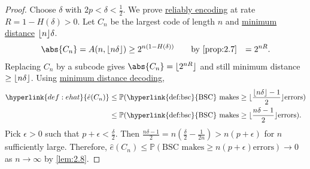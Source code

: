 \documentclass{article}
\DeclarePairedDelimiter{\floor}{\lfloor}{\rfloor}
\newcommand{\Prob}{\mathbb{P}}
\newcommand{\1}[1]{\mathbbm{1}_{#1}}
\begin{document}
\begin{proof}
    Choose $\delta$ with $2 p < \delta < \frac{1}{2}$. We prove \hyperlink{def:relTrans}{reliably encoding} at rate $R = 1 - H(\delta) > 0$.
    Let $C_n$ be the largest code of length $n$ and \hyperlink{def:minimumDistanceCode}{minimum distance} $\floor n \delta$.
    \begin{align*}
        \abs{C_n} = A(n, \floor{n \delta}) &\geq 2^{n (1 - H(\delta))} \qquad \text{by \cref{prop:2.7}}
                                           &= 2^{nR}.
    \end{align*}
    Replacing $C_n$ by a subcode gives $\abs{C_n} = \floor{2^{nR}}$ and still minimum distance $\geq \floor{n\delta}$.
    Using \hyperlink{def:minimumDistanceRule}{minimum distance decoding},
    \begin{align}
        \hyperlink{def:ehat}{\hat{e}(C_n)} &\leq \Prob(\text{\hyperlink{def:bsc}{BSC} makes} \geq \floor{\frac{\floor{n \delta}-1}{2}} \text{errors}) \\
        &\leq \Prob(\text{\hyperlink{def:bsc}{BSC} makes} \geq \floor{\frac{n \delta-1}{2}} \text{errors}). \\
    \end{align}
    Pick $\epsilon > 0$ such that $p + \epsilon < \frac{\delta}{2}$.
    Then $\frac{n \delta - 1}{2} = n \left(\frac{\delta}{2} - \frac{1}{2n}\right) > n(p+\epsilon)$ for $n$ sufficiently large.
    Therefore, $\hat{e}(C_n) \leq \Prob(\text{BSC makes} \geq n(p+\epsilon) \text{errors}) \to 0$ as $ n \to \infty$ by \cref{lem:2.8}.
\end{proof}
\end{document}
